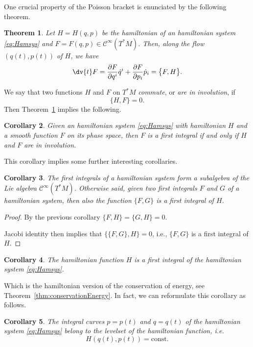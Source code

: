 \documentclass[english,fontsize=11pt,paper=b5]{scrbook}
\newtheorem{theorem}{Theorem}[chapter]
\newtheorem{corollary}[theorem]{Corollary}
\theoremstyle{definition}
\begin{document}
    One crucial property of the Poisson bracket is enunciated by the following theorem.

    \begin{theorem}\label{thm:poissondtdF}
      Let $H=H(q,p)$ be the hamiltonian of an hamiltonian system \eqref{eq:Hamsys} and $F=F(q,p)\in\mathcal{C}^\infty(T^*M)$.
      Then, along the flow $(q(t), p(t))$ of $H$, we have
      \begin{equation}
        \dv{t} F = \frac{\partial F}{\partial q^i} \dot q^i + \frac{\partial F}{\partial p_i} \dot p_i = \big\{F,H\big\}.
      \end{equation}
    \end{theorem}

    We say that two functions $H$ and $F$ on $T^* M$ \emph{commute}, or \emph{are in involution}, if
    \begin{equation}
      \big\{H,F\big\} = 0.
    \end{equation}
    Then Theorem~\ref{thm:poissondtdF} implies the following.
    \begin{corollary}
      Given an hamiltonian system \eqref{eq:Hamsys} with hamiltonian $H$ and a smooth function $F$ on its phase space, then $F$ is a first integral if and only if $H$ and $F$ are in involution.
    \end{corollary}

    This corollary implies some further interesting corollaries.
    \begin{corollary}
      The first integrals of a hamiltonian system form a subalgebra of the Lie algebra $\mathcal{C}^\infty(T^*M)$.
      Otherwise said, given two first integrals $F$ and $G$ of a hamiltonian system, then also the function $\big\{F,G\big\}$ is a first integral of $H$.
    \end{corollary}
    \begin{proof}
      By the previous corollary $\big\{F,H\big\} = \big\{G,H\big\} = 0$.

      Jacobi identity then implies that $\big\{\big\{F,G\big\},H\big\} = 0$, i.e., $\big\{F,G\big\}$ is a first integral of $H$.
    \end{proof}

    \begin{corollary}
      The hamiltonian function $H$ is a first integral of the hamiltonian system \eqref{eq:Hamsys}.
    \end{corollary}
    Which is the hamiltonian version of the conservation of energy, see Theorem~\ref{thm:conservationEnergy}.
    In fact, we can reformulate this corollary as follows.
    \begin{corollary}
      The integral curves $p = p(t)$ and $q=q(t)$ of the hamiltonian system \eqref{eq:Hamsys} belong to the levelset of the hamiltonian function, i.e.
      \begin{equation}
        H(q(t), p(t)) = \mathrm{const}.
      \end{equation}
    \end{corollary}
\end{document}
